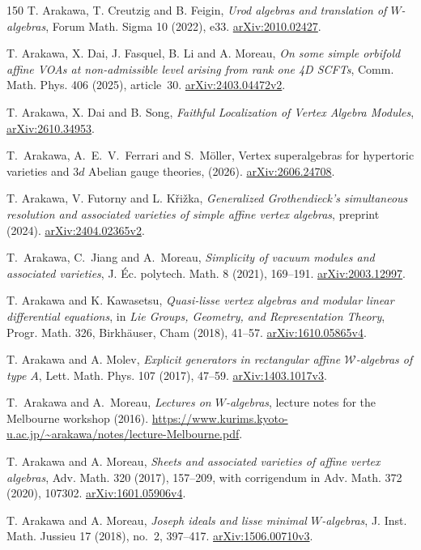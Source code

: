 \documentclass[11pt,a4paper]{amsart}
\numberwithin{equation}{section}
\theoremstyle{definition}
\theoremstyle{remark}
\newcommand{\arxiv}[1]{\href{https://arxiv.org/abs/#1}{arXiv:#1}}
\begin{document}
\begin{thebibliography}{150}
 T. Arakawa, T. Creutzig and B. Feigin,
\emph{Urod algebras and translation of $W$-algebras},
Forum Math. Sigma 10 (2022), e33. \arxiv{2010.02427}.

 T. Arakawa, X. Dai, J. Fasquel, B. Li and A. Moreau,
\emph{On some simple orbifold affine VOAs at non-admissible level arising from rank one 4D SCFTs},
Comm. Math. Phys. 406 (2025), article~30. \arxiv{2403.04472v2}.

 T. Arakawa, X. Dai and B. Song, \emph{Faithful Localization of Vertex Algebra Modules}, \arxiv{2610.34953}.

T.~Arakawa, A.~E.~V.~Ferrari and S.~M\"oller,
Vertex superalgebras for hypertoric varieties
and $3d$ Abelian gauge theories, (2026).
\arxiv{2606.24708}.

 T. Arakawa, V. Futorny and L. K\v{r}i\v{z}ka,
\emph{Generalized Grothendieck's simultaneous resolution and associated varieties of simple affine vertex algebras},
preprint (2024). \arxiv{2404.02365v2}.

 T.~Arakawa, C.~Jiang and A.~Moreau,
\emph{Simplicity of vacuum modules and associated varieties},
J. \'Ec. polytech. Math. 8 (2021), 169--191. \arxiv{2003.12997}.

 T. Arakawa and K. Kawasetsu,
\emph{Quasi-lisse vertex algebras and modular linear differential equations},
in \emph{Lie Groups, Geometry, and Representation Theory}, Progr. Math. 326, Birkh\"auser, Cham (2018), 41--57. \arxiv{1610.05865v4}.

 T. Arakawa and A. Molev,
\emph{Explicit generators in rectangular affine $\mathcal W$-algebras of type $A$},
Lett. Math. Phys. 107 (2017), 47--59. \arxiv{1403.1017v3}.

 T.~Arakawa and A.~Moreau,
\emph{Lectures on $W$-algebras}, lecture notes for the Melbourne workshop (2016).
\url{https://www.kurims.kyoto-u.ac.jp/~arakawa/notes/lecture-Melbourne.pdf}.

 T. Arakawa and A. Moreau,
\emph{Sheets and associated varieties of affine vertex algebras},
Adv. Math. 320 (2017), 157--209, with corrigendum in Adv. Math. 372 (2020), 107302. \arxiv{1601.05906v4}.

 T. Arakawa and A. Moreau,
\emph{Joseph ideals and lisse minimal $W$-algebras},
J. Inst. Math. Jussieu 17 (2018), no.~2, 397--417. \arxiv{1506.00710v3}.




\end{thebibliography}
\end{document}
